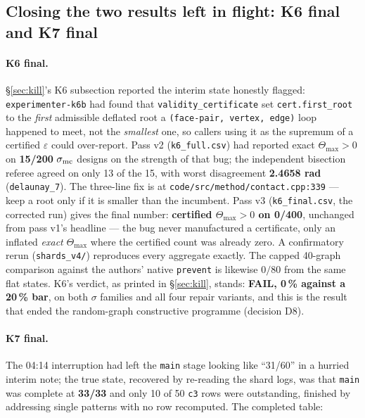 \documentclass[10pt,a4paper]{article}
\newcommand{\fn}[1]{\nolinkurl{#1}}
\begin{document}
\subsection{Closing the two results left in flight: K6 final and K7 final}
\label{sec:day3-k6k7}

\paragraph{K6 final.} \S\ref{sec:kill}'s K6 subsection reported the interim state honestly
flagged: \texttt{experimenter-k6b} had found that \fn{validity\_certificate} set
\texttt{cert.first\_root} to the \emph{first} admissible deflated root a
\texttt{(face-pair, vertex, edge)} loop happened to meet, not the \emph{smallest} one, so callers
using it as the supremum of a certified $\varepsilon$ could over-report. Pass v2
(\fn{k6\_full.csv}) had reported exact $\Theta_{\max}>0$ on \textbf{15/200} $\sigma_{\rm mc}$
designs on the strength of that bug; the independent bisection referee agreed on only 13 of the
15, with worst disagreement \textbf{2.4658 rad} (\fn{delaunay\_7}). The three-line fix is at
\fn{code/src/method/contact.cpp:339} --- keep a root only if it is smaller than the incumbent.
Pass v3 (\fn{k6\_final.csv}, the corrected run) gives the final number:
\textbf{certified $\Theta_{\max}>0$ on 0/400}, unchanged from pass v1's headline --- the bug never
manufactured a certificate, only an inflated \emph{exact} $\Theta_{\max}$ where the certified
count was already zero. A confirmatory rerun (\fn{shards\_v4/}) reproduces every aggregate
exactly. The capped 40-graph comparison against the authors' native \fn{prevent} is likewise
$0/80$ from the same flat states. K6's verdict, as printed in \S\ref{sec:kill}, stands:
\textbf{FAIL, 0\,\% against a 20\,\% bar}, on both $\sigma$ families and all four repair
variants, and this is the result that ended the random-graph constructive programme
(decision D8).

\paragraph{K7 final.} The 04:14 interruption had left the \texttt{main} stage looking like
``31/60'' in a hurried interim note; the true state, recovered by re-reading the shard logs, was
that \texttt{main} was complete at \textbf{33/33} and only 10 of 50 \texttt{c3} rows were
outstanding, finished by addressing single patterns with no row recomputed. The completed table:
\end{document}
